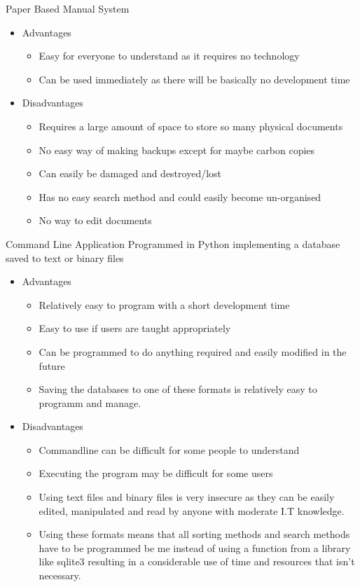 Paper Based Manual System

\begin{itemize}
	\item Advantages
	\begin{itemize}
		\item Easy for everyone to understand as it requires no technology
		\item Can be used immediately as there will be basically no development time
	\end{itemize}
	\item Disadvantages
	\begin{itemize}
		\item Requires a large amount of space to store so many physical documents
		\item No easy way of making backups except for maybe carbon copies
		\item Can easily be damaged and destroyed/lost
		\item Has no easy search method and could easily become un-organised
		\item No way to edit documents
	\end{itemize}
\end{itemize}

Command Line Application Programmed in Python implementing a database saved to text or binary files

\begin{itemize}
	\item Advantages
	\begin{itemize}
		\item Relatively easy to program with a short development time
		\item Easy to use if users are taught appropriately
		\item Can be programmed to do anything required and easily modified in the future
		\item Saving the databases to one of these formats is relatively easy to programm and manage.
	\end{itemize}
	\item Disadvantages
	\begin{itemize}
		\item Commandline can be difficult for some people to understand 
		\item Executing the program may be difficult for some users
		\item Using text files and binary files is very insecure as they can be easily edited, manipulated and read by anyone with moderate I.T knowledge.
		\item Using these formats means that all sorting methods and search methods have to be programmed be me instead of using a function from a library like sqlite3 resulting in a considerable use of time and resources that isn't necessary.
	\end{itemize}
\end{itemize}

